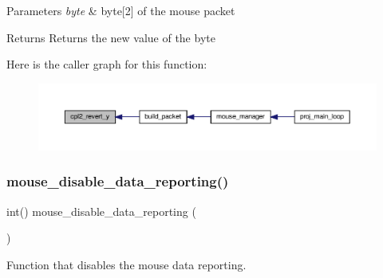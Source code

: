 \begin{DoxyParams}{Parameters}
{\em byte} & byte\mbox{[}2\mbox{]} of the mouse packet\\
\hline
\end{DoxyParams}
\begin{DoxyReturn}{Returns}
Returns the new value of the byte 
\end{DoxyReturn}
Here is the caller graph for this function\+:
\nopagebreak
\begin{figure}[H]
\begin{center}
\leavevmode
\includegraphics[width=350pt]{group__mouse_gaf9b79deb06853057db6850cb4b7ec917_icgraph}
\end{center}
\end{figure}
\mbox{\label{group__mouse_ga7e311379d4d64f88873ef8ade5c82a25}} 
\subsubsection{\texorpdfstring{mouse\+\_\+disable\+\_\+data\+\_\+reporting()}{mouse\_disable\_data\_reporting()}}
{\footnotesize\ttfamily int() mouse\+\_\+disable\+\_\+data\+\_\+reporting (\begin{DoxyParamCaption}{ }\end{DoxyParamCaption})}



Function that disables the mouse data reporting. 

